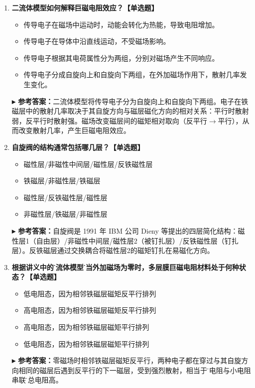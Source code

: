 \documentclass[12pt,a4paper]{article}
\newcommand{\answer}[1]{\vspace{2pt}\noindent\textbf{\color{teal!80!black}▸ 参考答案：}#1\vspace{4pt}}
\begin{document}
\begin{enumerate}[label=\arabic*.]
    \item \textbf{二流体模型如何解释巨磁电阻效应？【单选题】}
    \begin{itemize}
        \item 传导电子在磁场中运动时，动能会转化为热能，导致电阻增加。
        \item 传导电子在导体中沿直线运动，不受磁场影响。
        \item 传导电子根据其电荷属性分为两组，分别对磁场产生不同响应。
        \item[\checkmark] 传导电子分成自旋向上和自旋向下两组，在外加磁场作用下，散射几率发生变化。
    \end{itemize}
    \answer{二流体模型将传导电子分为自旋向上和自旋向下两组。电子在铁磁层中的散射几率取决于其自旋方向与磁层磁化方向的相对关系：平行时散射弱，反平行时散射强。磁场改变磁层间的磁矩相对取向（反平行$\to$平行），从而改变散射几率，产生巨磁电阻效应。}

    \item \textbf{自旋阀的结构通常包括哪几层？【单选题】}
    \begin{itemize}
        \item[\checkmark] 磁性层/非磁性中间层/磁性层/反铁磁性层
        \item 铁磁层/非磁性层/铁磁层
        \item 磁性层/反铁磁性层/磁性层
        \item 非磁性层/铁磁层/非磁性层
    \end{itemize}
    \answer{自旋阀是 1991 年 IBM 公司 Dieny 等提出的四层简化结构：磁性层1（自由层）/非磁性中间层/磁性层2（被钉扎层）/反铁磁性层（钉扎层）。反铁磁层通过交换耦合将磁性层2的磁矩钉扎在易磁化方向。}

    \item \textbf{根据讲义中的\"二流体模型\"，当外加磁场为零时，多层膜巨磁电阻材料处于何种状态？【单选题】}
    \begin{itemize}
        \item 低电阻态，因为相邻铁磁层磁矩反平行排列
        \item[\checkmark] 高电阻态，因为相邻铁磁层磁矩反平行排列
        \item 高电阻态，因为相邻铁磁层磁矩平行排列
        \item 低电阻态，因为相邻铁磁层磁矩平行排列
    \end{itemize}
    \answer{零磁场时相邻铁磁层磁矩反平行，两种电子都在穿过与其自旋方向相同的磁层后遇到反平行的下一磁层，受到强烈散射，相当于\"大电阻与小电阻串联\"，总电阻高。}


\end{enumerate}
\end{document}
